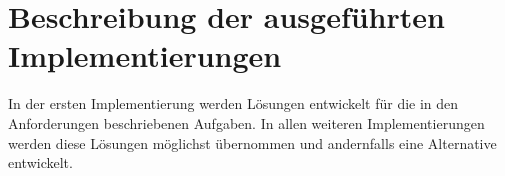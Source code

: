 %
%
\newpage
\section{Beschreibung der ausgeführten Implementierungen}
In der ersten Implementierung werden Lösungen entwickelt für die in den Anforderungen beschriebenen Aufgaben. In allen weiteren Implementierungen werden diese Lösungen möglichst übernommen und andernfalls eine Alternative entwickelt.\\


